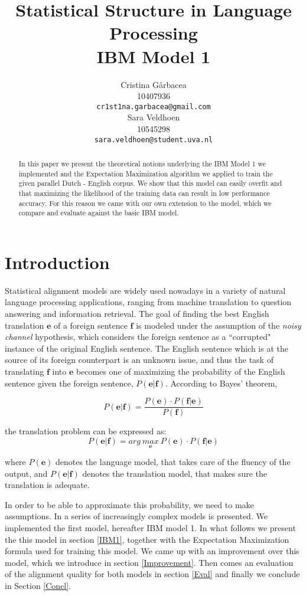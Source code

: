 \documentclass[11pt]{article}
\title{Statistical Structure in Language Processing \\ IBM Model 1}
\author{ Cristina G\^arbacea\\
  10407936 \\
  {\tt cr1st1na.garbacea@gmail.com} 
  \\\And
  Sara Veldhoen \\
10545298   \\
  {\small \tt sara.veldhoen@student.uva.nl} \\}
\date{}
\renewcommand{\vec}[1]{\mathbf{#1}}
\begin{document}
\maketitle

\begin{abstract}
In this paper we present the theoretical notions underlying the IBM Model 1 we implemented and the Expectation Maximization algorithm we applied to train the given parallel Dutch - English corpus. We show that this model can easily overfit and that maximizing the likelihood of the training data can result in low performance accuracy.%
 For this reason we came with our own extension to the model, which we compare and evaluate against the basic IBM model. 
\end{abstract}

\section{Introduction}
Statistical alignment models are widely used nowadays in a variety of natural language processing applications, ranging from machine translation to question answering and information retrieval. The goal of finding the best English translation $\vec{e}$ of a foreign sentence $\vec{f}$ is modeled under the assumption of the \textit{noisy channel} hypothesis, which considers the foreign sentence as a ``corrupted" instance of the original English sentence. The English sentence which is at the source of its foreign counterpart is an unknown issue, and thus the task of translating $\vec{f}$ into $\vec{e}$ becomes one of maximizing the probability of the English sentence given the foreign sentence, $P(\vec{e}|\vec{f})$. According to Bayes' theorem, 

\begin{equation}
P(\vec{e}|\vec{f})= \frac{P(\vec{e})\cdot P(\vec{f}|\vec{e})}{P(\vec{f})}
\end{equation}

the translation problem can be expressed as:
\begin{equation}
P(\vec{e}|\vec{f})= arg \ \underset{\vec{e}}{max} \ P(\vec{e})\cdot P(\vec{f}|\vec{e})
\end{equation}

where $P(\vec{e})$ denotes the language model, that takes care of the fluency of the output, 
 and $P(\vec{e}|\vec{f})$ denotes the translation model, that makes sure the translation is adequate. 

In order to be able to approximate this probability, we need to make assumptions. In %
a series of increasingly complex models is presented. We implemented the first model, hereafter IBM model 1. 
In what follows we present the this model in section \ref{IBM1}, together with the Expectation Maximization formula used for training this model. We came up with an improvement over this model, which we introduce in section \ref{Improvement}. Then comes an evaluation of the alignment quality for both models in section \ref{Eval} and finally we conclude in Section \ref{Concl}.
\end{document}
